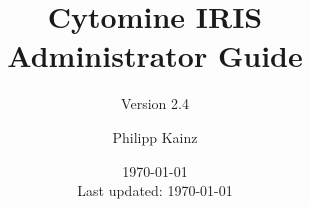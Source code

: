 \documentclass[
a4paper,
11pt,
oneside,
headsepline
]{scrbook}
\def\appVersion{2.4}
\begin{document}
\begin{titlepage}

\end{titlepage}

\frontmatter

\subject{Interobserver Reliability Study Module}
\title{Cytomine IRIS\\Administrator Guide}
\subtitle{Version \appVersion}
\author{Philipp Kainz}
\date{{\monthyear\today} \\{\small Last updated: \today}}
\maketitle


\newpage
{
\hypersetup{linkcolor=black}
\noptcrule
\doparttoc[n] 
\tableofcontents
}
\mainmatter





\end{document}
